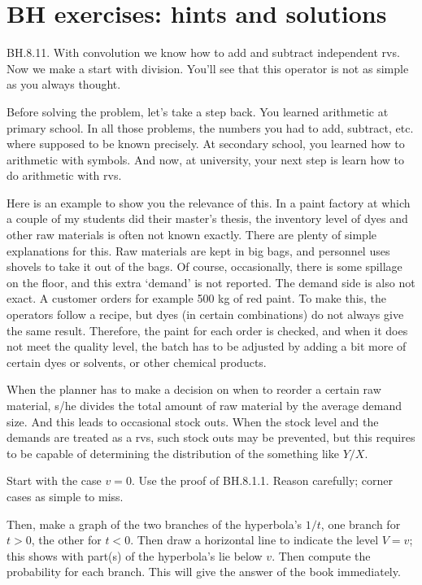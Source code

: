 \section{BH exercises: hints and solutions}


\begin{exercise} BH.8.11. With convolution we know how to  add and subtract independent rvs. Now we make a start with division. You'll see that this operator is not as simple as you always thought.

Before solving the problem, let's take a step back.
You learned arithmetic at primary school.
In all those problems, the numbers you had to add, subtract, etc.
where supposed to be known precisely.
At secondary school, you learned how to arithmetic with symbols.
And now, at university, your next step is learn how to do arithmetic with rvs.

Here is an example to show you the relevance of this.
In a paint factory at which a couple of my students did their master's thesis, the inventory level of dyes and other raw materials is often not known exactly.
There are plenty of simple explanations for this.
Raw materials are kept in big bags, and personnel uses shovels to take it out of the bags.
Of course, occasionally, there is some spillage on the floor, and this extra `demand' is not reported.
The demand side is also not exact.
A customer orders for example 500 kg of red paint.
To make this, the operators follow a recipe, but dyes (in certain combinations) do not always give the same  result. Therefore, the paint for each order is checked, and when it does not meet the quality level, the batch has to be adjusted by adding a bit more of certain dyes or solvents, or other chemical products.

When the planner has to make a decision on when to reorder a certain raw material, s/he divides the total amount of raw material by the average demand size. And this leads to occasional stock outs. When the stock level and the demands are treated as a rvs, such stock outs may be prevented, but this requires to be capable of determining the distribution of the something like $Y/X$.

\begin{hint}
Start with the case $v=0$. Use the proof of BH.8.1.1. Reason carefully; corner cases as simple to miss.

Then, make a graph of the two branches of the hyperbola's $1/t$, one branch for $t>0$, the other for $t<0$.
Then draw a horizontal line to indicate the level $V=v$; this shows with part(s) of the hyperbola's lie below $v$.
Then compute the probability for each branch. This will give the answer of the  book immediately.
\end{hint}
\begin{solution}


\end{solution}
\end{exercise}
